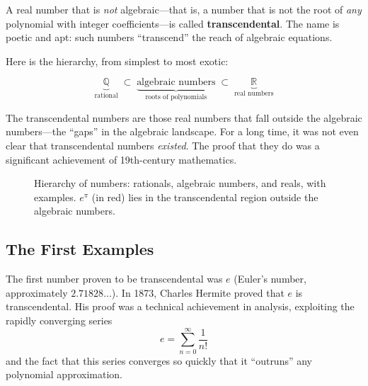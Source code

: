 A real number that is \emph{not} algebraic---that is, a number that is not the root of \emph{any} polynomial with integer coefficients---is called \textbf{transcendental}. The name is poetic and apt: such numbers ``transcend'' the reach of algebraic equations.

Here is the hierarchy, from simplest to most exotic:

\[
    \underbrace{\mathbb{Q}}_{\text{rational}} \;\subset\; \underbrace{\text{algebraic numbers}}_{\text{roots of polynomials}} \;\subset\; \underbrace{\mathbb{R}}_{\text{real numbers}}
\]

The transcendental numbers are those real numbers that fall outside the algebraic numbers---the ``gaps'' in the algebraic landscape. For a long time, it was not even clear that transcendental numbers \emph{existed}. The proof that they do was a significant achievement of 19th-century mathematics.

\begin{figure}[htbp]
\centering
{}
\caption{Hierarchy of numbers: rationals, algebraic numbers, and reals, with examples. $e^\pi$ (in red) lies in the transcendental region outside the algebraic numbers.}
\label{fig:number-hierarchy}
\end{figure}

\subsection{The First Examples}

The first number proven to be transcendental was $e$ (Euler's number, approximately $2.71828\ldots$). In 1873, Charles Hermite proved that $e$ is transcendental. His proof was a technical achievement in analysis, exploiting the rapidly converging series
\[
    e = \sum_{n=0}^{\infty} \frac{1}{n!}
\]
and the fact that this series converges so quickly that it ``outruns'' any polynomial approximation.

